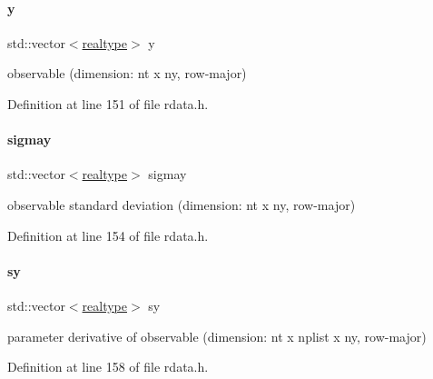 \mbox{\label{classamici_1_1_return_data_accf479492e699cb5e931c2a698148924}} 
\paragraph{\texorpdfstring{y}{y}}
{\footnotesize\ttfamily std\+::vector$<$\mbox{\hyperlink{namespaceamici_a1bdce28051d6a53868f7ccbf5f2c14a3}{realtype}}$>$ y}

observable (dimension\+: nt x ny, row-\/major) 

Definition at line 151 of file rdata.\+h.

\mbox{\label{classamici_1_1_return_data_a7dc280c0479f4a1fffe67fea251c26d2}} 
\paragraph{\texorpdfstring{sigmay}{sigmay}}
{\footnotesize\ttfamily std\+::vector$<$\mbox{\hyperlink{namespaceamici_a1bdce28051d6a53868f7ccbf5f2c14a3}{realtype}}$>$ sigmay}

observable standard deviation (dimension\+: nt x ny, row-\/major) 

Definition at line 154 of file rdata.\+h.

\mbox{\label{classamici_1_1_return_data_afae9aa5147266c51f0ac5004f1cdfbe0}} 
\paragraph{\texorpdfstring{sy}{sy}}
{\footnotesize\ttfamily std\+::vector$<$\mbox{\hyperlink{namespaceamici_a1bdce28051d6a53868f7ccbf5f2c14a3}{realtype}}$>$ sy}

parameter derivative of observable (dimension\+: nt x nplist x ny, row-\/major) 

Definition at line 158 of file rdata.\+h.

\mbox{\label{classamici_1_1_return_data_a7a8085d13686e18d9575fabf3a289e10}} 
